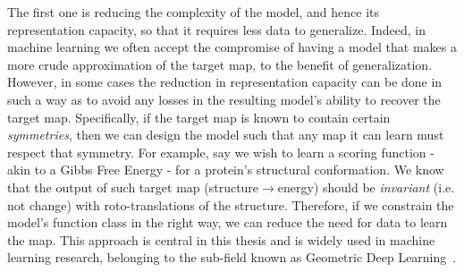 The first one is reducing the complexity of the model, and hence its representation capacity, so that it requires less data to generalize.
Indeed, in machine learning we often accept the compromise of having a model that makes a more crude approximation of the target map,
to the benefit of generalization.
However, in some cases the reduction in representation capacity can be done in such a way as to avoid any losses in the resulting model's ability
to recover the target map. Specifically, if the target map is known to contain certain \textit{symmetries}, then we can design the model such that
any map it can learn must respect that symmetry. For example, say we wish to learn a scoring function - akin to a Gibbs Free Energy - for a protein's
structural conformation. We know that the output of such target map (structure$\to$energy) should be \textit{invariant} (i.e. not change)
with roto-translations of the structure. Therefore, if we constrain the model's function class in the right way, we can reduce the need for data
to learn the map. This approach is central in this thesis and is widely used in
machine learning research, belonging to the sub-field known as Geometric Deep Learning~\citep{bronstein_geometric_2021}.

